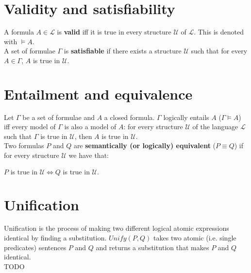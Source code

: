 \documentclass{article}
\begin{document}
\section*{Validity and satisfiability}

A formula $A \in \mathcal{L}$ is \textbf{valid} iff it is true in every structure $\mathcal{U}$ of $\mathcal{L}$. This is denoted with $\models A$. \\
A set of formulae $\Gamma$ is \textbf{satisfiable} if there exists a structure $\mathcal{U}$ such that for every $A \in \Gamma$, $A$ is true in $\mathcal{U}$.

\section*{Entailment and equivalence}

Let $\Gamma$ be a set of formulae and $A$ a closed formula. $\Gamma$ logically entails $A$ ($\Gamma \models A$) iff every model of $\Gamma$ is also a model of $A$: for every structure $\mathcal{U}$ of the language $\mathcal{L}$ such that $\Gamma$ is true in $\mathcal{U}$, then $A$ is true in $\mathcal{U}$.\\

Two formulas $P$ and $Q$ are \textbf{semantically (or logically) equivalent} ($P \equiv Q$) if for every structure $\mathcal{U}$ we have that:

\begin{center}
    $P$ is true in $\mathcal{U} \iff Q$ is true in $\mathcal{U}$.
\end{center}

\newpage

\section{Unification}

Unification is the process of making two different logical atomic expressions identical by finding a substitution. $Unify(P, Q)$ takes two atomic (i.e. single predicates) sentences $P$ and $Q$ and returns a substitution that makes $P$ and $Q$ identical. \\

TODO

\newpage
\end{document}
